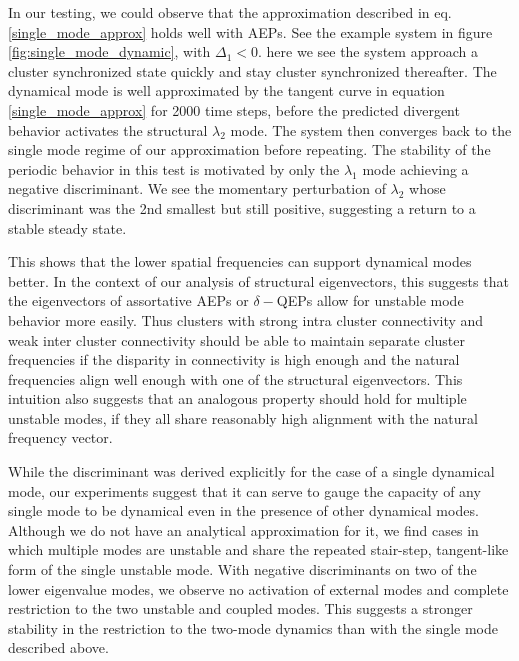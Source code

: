 \documentclass[%
 aip,
 amsmath,amssymb,
preprint,
reprint, onecolumn %
]{revtex4-1}
\begin{document}

In our testing, we could observe that the approximation described in eq. \ref{single_mode_approx} holds well with AEPs. See the example system in figure \ref{fig:single_mode_dynamic}, with $\Delta_{1}<0$. here we see the system approach a cluster synchronized state quickly and stay cluster synchronized thereafter. The dynamical mode is well approximated by the tangent curve in equation \ref{single_mode_approx} for 2000 time steps, before the predicted divergent behavior activates the structural $\lambda_2$ mode. The system then converges back to the single mode regime of our approximation before repeating. The stability of the periodic behavior in this test is motivated by only the $\lambda_1$ mode achieving a negative discriminant. We see the momentary perturbation of $\lambda_2$ whose discriminant was the 2nd smallest but still positive, suggesting a return to a stable steady state. 


This shows that the lower spatial frequencies can support dynamical modes better. In the context of our analysis of structural eigenvectors, this suggests that the eigenvectors of assortative AEPs or $\delta-$QEPs allow for unstable mode behavior more easily. Thus clusters with strong intra cluster connectivity and weak inter cluster connectivity should be able to maintain separate cluster frequencies if the disparity in connectivity is high enough and the natural frequencies align well enough with one of the structural eigenvectors. This intuition also suggests that an analogous property should hold for multiple unstable modes, if they all share reasonably high alignment with the natural frequency vector.

While the discriminant was derived  explicitly for the case of a single dynamical mode, our experiments suggest that it can serve to gauge the capacity of any single mode to be dynamical even in the presence of other dynamical modes. Although we do not have an analytical approximation for it, we find cases in which multiple modes are unstable and share the repeated stair-step, tangent-like form of the single unstable mode. With negative discriminants on two of the lower eigenvalue modes, we observe no activation of external modes and complete restriction to the two unstable and coupled modes. This suggests a stronger stability in the restriction to the two-mode dynamics than with the single mode described above. 
\end{document}
